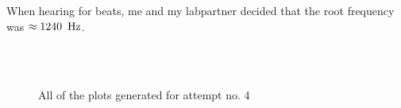 \documentclass[11pt,a4paper]{article}
\begin{document}
    When hearing for beats, me and my labpartner decided that the root frequency was $\approx 1240\enspace\textup{Hz}$.
    \newline
    \begin{figure}[H]
      \centering
       \\
       \\
      \caption{All of the plots generated for attempt no. 4}
      \label{fig:sound_exp1}
    \end{figure}
\end{document}
